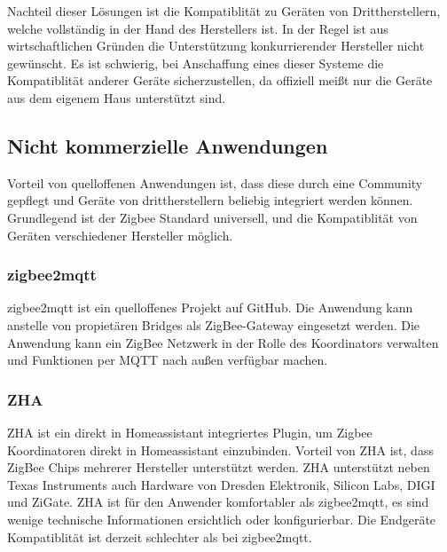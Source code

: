 Nachteil dieser Lösungen ist die Kompatiblität zu Geräten von Drittherstellern, welche vollständig in der Hand des Herstellers ist. In der Regel ist aus
wirtschaftlichen Gründen die Unterstützung konkurrierender Hersteller nicht gewünscht. Es ist schwierig, bei Anschaffung eines dieser Systeme die Kompatiblität
anderer Geräte sicherzustellen, da offiziell meißt nur die Geräte aus dem eigenem Haus unterstützt sind.

\subsection{Nicht kommerzielle Anwendungen}

Vorteil von quelloffenen Anwendungen ist, dass diese durch eine Community gepflegt und Geräte von drittherstellern beliebig integriert werden können.
Grundlegend ist der Zigbee Standard universell, und die Kompatiblität von Geräten verschiedener Hersteller möglich.

\subsubsection{zigbee2mqtt}

zigbee2mqtt \cite{z2m} ist ein quelloffenes Projekt auf GitHub. Die Anwendung kann anstelle von propietären Bridges als ZigBee-Gateway
eingesetzt werden. Die Anwendung kann ein ZigBee Netzwerk in der Rolle des Koordinators verwalten und Funktionen per MQTT nach außen verfügbar machen.

\subsubsection{ZHA}
ZHA ist ein direkt in Homeassistant integriertes Plugin, um Zigbee Koordinatoren direkt in Homeassistant einzubinden. Vorteil
von ZHA ist, dass ZigBee Chips mehrerer Hersteller unterstützt werden. ZHA unterstützt neben Texas Instruments auch Hardware von Dresden Elektronik,
Silicon Labs, DIGI und ZiGate. ZHA ist für den Anwender komfortabler als zigbee2mqtt, es sind wenige technische Informationen ersichtlich oder konfigurierbar.
Die Endgeräte Kompatiblität ist derzeit schlechter als bei zigbee2mqtt.








